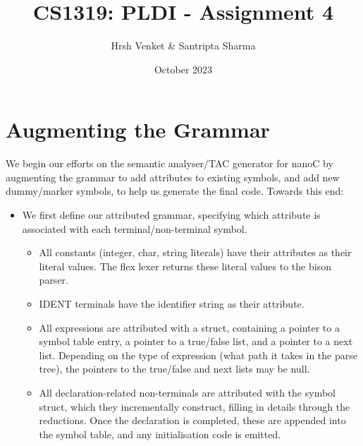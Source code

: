 \documentclass{article}
\title{CS1319: PLDI - Assignment 4}
\author{Hrsh Venket \& Santripta Sharma}
\date{October 2023}
\begin{document}
\maketitle 

\section{Augmenting the Grammar}
We begin our efforts on the semantic analyser/TAC generator for nanoC by augmenting the grammar to add attributes to existing symbols, and add new dummy/marker symbols, to help us generate the final code. Towards this end:

\begin{itemize}
	\item We first define our attributed grammar, specifying which attribute is associated with each terminal/non-terminal symbol. \begin{itemize}
		\item All constants (integer, char, string literals) have their attributes as their literal values. The flex lexer returns these literal values to the bison parser.
		\item IDENT terminals have the identifier string as their attribute.
		\item All expressions are attributed with a struct, containing a pointer to a symbol table entry, a pointer to a true/false list, and a pointer to a next list. Depending on the type of expression (what path it takes in the parse tree), the pointers to the true/false and next lists may be null.
		\item All declaration-related non-terminals are attributed with the symbol struct, which they incrementally construct, filling in details through the reductions. Once the declaration is completed, these are appended into the symbol table, and any initialisation code is emitted.
	\end{itemize}
\end{itemize}
\end{document}
